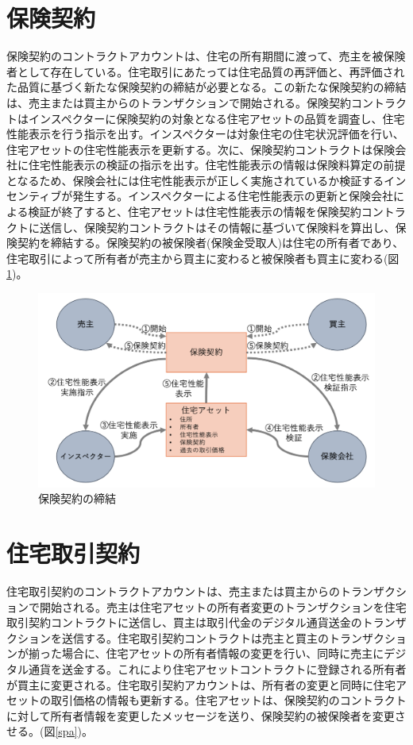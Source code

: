 \documentclass[a4paper,fontsize=11pt,report,notitlepage,line_length=38zw,number_of_lines=40,dvipdfmx]{jlreq}
\begin{document}
\section{保険契約}
保険契約のコントラクトアカウントは、住宅の所有期間に渡って、売主を被保険者として存在している。住宅取引にあたっては住宅品質の再評価と、再評価された品質に基づく新たな保険契約の締結が必要となる。この新たな保険契約の締結は、売主または買主からのトランザクションで開始される。保険契約コントラクトはインスペクターに保険契約の対象となる住宅アセットの品質を調査し、住宅性能表示を行う指示を出す。インスペクターは対象住宅の住宅状況評価を行い、住宅アセットの住宅性能表示を更新する。次に、保険契約コントラクトは保険会社に住宅性能表示の検証の指示を出す。住宅性能表示の情報は保険料算定の前提となるため、保険会社には住宅性能表示が正しく実施されているか検証するインセンティブが発生する。インスペクターによる住宅性能表示の更新と保険会社による検証が終了すると、住宅アセットは住宅性能表示の情報を保険契約コントラクトに送信し、保険契約コントラクトはその情報に基づいて保険料を算出し、保険契約を締結する。保険契約の被保険者(保険金受取人)は住宅の所有者であり、住宅取引によって所有者が売主から買主に変わると被保険者も買主に変わる(図\ref{insurance})。

\begin{figure}
 \centering
 \includegraphics[width=12cm]{insurance.png}
 \caption{保険契約の締結}
 \label{insurance}
\end{figure}

\section{住宅取引契約}
住宅取引契約のコントラクトアカウントは、売主または買主からのトランザクションで開始される。売主は住宅アセットの所有者変更のトランザクションを住宅取引契約コントラクトに送信し、買主は取引代金のデジタル通貨送金のトランザクションを送信する。住宅取引契約コントラクトは売主と買主のトランザクションが揃った場合に、住宅アセットの所有者情報の変更を行い、同時に売主にデジタル通貨を送金する。これにより住宅アセットコントラクトに登録される所有者が買主に変更される。住宅取引契約アカウントは、所有者の変更と同時に住宅アセットの取引価格の情報も更新する。住宅アセットは、保険契約のコントラクトに対して所有者情報を変更したメッセージを送り、保険契約の被保険者を変更させる。(図\ref{spa})。
\end{document}
